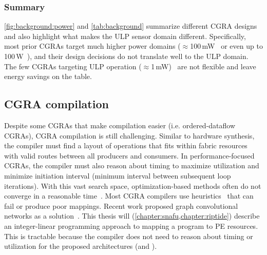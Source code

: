 \subsubsection{Summary}
\autoref{fig:background:power} and \autoref{tab:background} summarize different CGRA designs and also highlight what makes the ULP sensor domain different.
% 
Specifically, most prior CGRAs target much higher power domains ($\approx$100\,mW~\cite{weng2020dsagen,karunaratne2017hycube,nowatzki:isca17:stream-dataflow,tan2018stitch,weng2020hybrid} or even up to 100\,W~\cite{plasticine,voitsechov2014single}),
and their design decisions do not translate well to the ULP domain.
%
The few CGRAs targeting ULP operation ($\approx$1\,mW)~\cite{ipa,cma,srp} are not flexible and leave energy savings on the table. 

\subsection{CGRA compilation}
Despite some CGRAs that make compilation easier (i.e. ordered-dataflow CGRAs), CGRA compilation is still challenging.
% 
Similar to hardware synthesis, the compiler must find a layout of
operations that fits within fabric resources with valid routes between
all producers and consumers.
%
In performance-focused CGRAs, the compiler must also reason
about timing to maximize utilization and minimize
initiation interval (minimum interval between subsequent loop iterations).
%
With this vast search space, optimization-based methods often
do not converge in a reasonable time~\cite{hybrid-sched,nowatzki2013general}.
%
Most CGRA compilers use heuristics~\cite{opencgra,revamp,park2008edge,mei2002dresc,dora,nowatzki2013general,hybrid-sched,weng2020dsagen} that can 
fail or produce poor mappings.
%
Recent work proposed graph convolutional networks as a
solution~\cite{mirhoseini2020chip}.
% 
This thesis will (\autoref{chapter:snafu,chapter:riptide}) describe an integer-linear programming approach to mapping a program to PE resources.
% 
This is tractable because the compiler does not need to reason about timing or
utilization for the proposed architectures (\snafu and \riptide).

